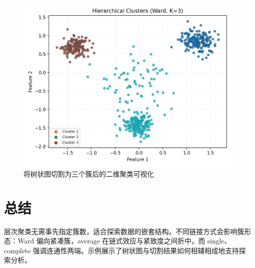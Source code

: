 \documentclass[UTF8,zihao=-4]{ctexart}
\begin{document}
\begin{figure}[H]
  \centering
  \includegraphics[width=0.82\linewidth]{hierarchical_clusters.png}
  \caption{将树状图切割为三个簇后的二维聚类可视化}
  \label{fig:hierarchical_clusters_cn}
\end{figure}

\FloatBarrier
\section{总结}
层次聚类无需事先指定簇数，适合探索数据的嵌套结构。不同链接方式会影响簇形态：Ward 偏向紧凑簇，average 在链式效应与紧致度之间折中，而 single、complete 强调连通性两端。示例展示了树状图与切割结果如何相辅相成地支持探索分析。
\end{document}
